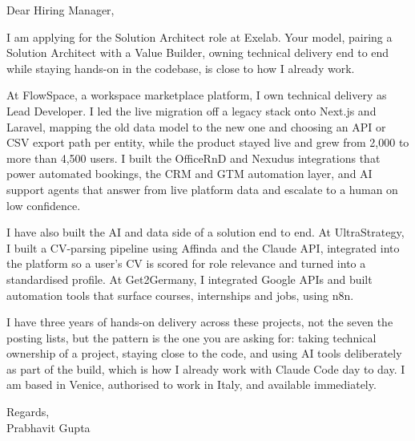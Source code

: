 \documentclass[a4paper,11pt]{article}
\begin{document}
Dear Hiring Manager,

I am applying for the Solution Architect role at Exelab. Your model, pairing a Solution Architect with a Value Builder, owning technical delivery end to end while staying hands-on in the codebase, is close to how I already work.

At FlowSpace, a workspace marketplace platform, I own technical delivery as Lead Developer. I led the live migration off a legacy stack onto Next.js and Laravel, mapping the old data model to the new one and choosing an API or CSV export path per entity, while the product stayed live and grew from 2,000 to more than 4,500 users. I built the OfficeRnD and Nexudus integrations that power automated bookings, the CRM and GTM automation layer, and AI support agents that answer from live platform data and escalate to a human on low confidence.

I have also built the AI and data side of a solution end to end. At UltraStrategy, I built a CV-parsing pipeline using Affinda and the Claude API, integrated into the platform so a user's CV is scored for role relevance and turned into a standardised profile. At Get2Germany, I integrated Google APIs and built automation tools that surface courses, internships and jobs, using n8n.

I have three years of hands-on delivery across these projects, not the seven the posting lists, but the pattern is the one you are asking for: taking technical ownership of a project, staying close to the code, and using AI tools deliberately as part of the build, which is how I already work with Claude Code day to day. I am based in Venice, authorised to work in Italy, and available immediately.

Regards,\\
Prabhavit Gupta
\end{document}
